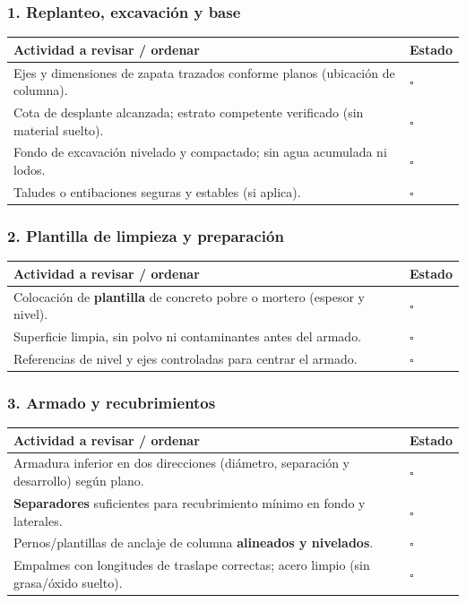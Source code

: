 \documentclass[12pt]{article}
\newcommand{\cbox}{\(\square\)} %
\begin{document}
	\subsubsection*{1. Replanteo, excavación y base}
	\begin{tabularx}{\linewidth}{>{\raggedright\arraybackslash}p{0.93\linewidth} >{\centering\arraybackslash}m{0.07\linewidth}}
		\toprule
		\textbf{Actividad a revisar / ordenar} & \textbf{Estado}\\
		\midrule
		Ejes y dimensiones de zapata trazados conforme planos (ubicación de columna). & \cbox \\
		Cota de desplante alcanzada; estrato competente verificado (sin material suelto). & \cbox \\
		Fondo de excavación nivelado y compactado; sin agua acumulada ni lodos. & \cbox \\
		Taludes o entibaciones seguras y estables (si aplica). & \cbox \\
		\bottomrule
	\end{tabularx}
	
	\subsubsection*{2. Plantilla de limpieza y preparación}
	\begin{tabularx}{\linewidth}{>{\raggedright\arraybackslash}p{0.93\linewidth} >{\centering\arraybackslash}m{0.07\linewidth}}
		\toprule
		\textbf{Actividad a revisar / ordenar} & \textbf{Estado}\\
		\midrule
		Colocación de \textbf{plantilla} de concreto pobre o mortero (espesor y nivel). & \cbox \\
		Superficie limpia, sin polvo ni contaminantes antes del armado. & \cbox \\
		Referencias de nivel y ejes controladas para centrar el armado. & \cbox \\
		\bottomrule
	\end{tabularx}
	
	\subsubsection*{3. Armado y recubrimientos}
	\begin{tabularx}{\linewidth}{>{\raggedright\arraybackslash}p{0.93\linewidth} >{\centering\arraybackslash}m{0.07\linewidth}}
		\toprule
		\textbf{Actividad a revisar / ordenar} & \textbf{Estado}\\
		\midrule
		Armadura inferior en dos direcciones (diámetro, separación y desarrollo) según plano. & \cbox \\
		\textbf{Separadores} suficientes para recubrimiento mínimo en fondo y laterales. & \cbox \\
		Pernos/plantillas de anclaje de columna \textbf{alineados y nivelados}. & \cbox \\
		Empalmes con longitudes de traslape correctas; acero limpio (sin grasa/óxido suelto). & \cbox \\
		\bottomrule
	\end{tabularx}
	
\end{document}
